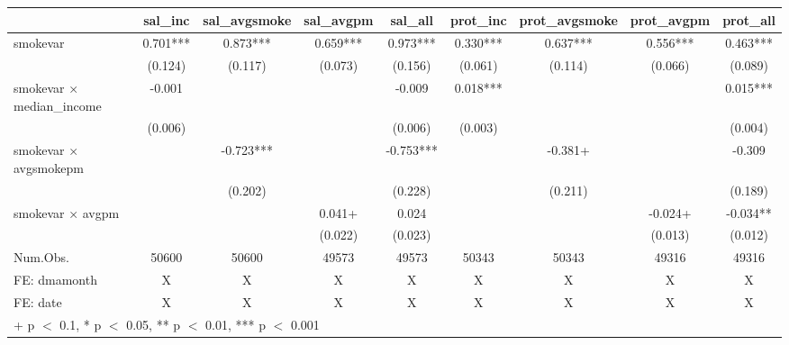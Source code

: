 \begin{table}
\centering
\begin{tabular}[t]{lcccccccc}
\toprule
  & sal\_inc & sal\_avgsmoke & sal\_avgpm & sal\_all & prot\_inc & prot\_avgsmoke & prot\_avgpm & prot\_all\\
\midrule
smokevar & 0.701*** & 0.873*** & 0.659*** & 0.973*** & 0.330*** & 0.637*** & 0.556*** & 0.463***\\
 & (0.124) & (0.117) & (0.073) & (0.156) & (0.061) & (0.114) & (0.066) & (0.089)\\
smokevar × median\_income & -0.001 &  &  & -0.009 & 0.018*** &  &  & 0.015***\\
 & (0.006) &  &  & (0.006) & (0.003) &  &  & (0.004)\\
smokevar × avgsmokepm &  & -0.723*** &  & -0.753*** &  & -0.381+ &  & -0.309\\
 &  & (0.202) &  & (0.228) &  & (0.211) &  & (0.189)\\
smokevar × avgpm &  &  & 0.041+ & 0.024 &  &  & -0.024+ & -0.034**\\
 &  &  & (0.022) & (0.023) &  &  & (0.013) & (0.012)\\
\midrule
Num.Obs. & 50600 & 50600 & 49573 & 49573 & 50343 & 50343 & 49316 & 49316\\
FE: dmamonth & X & X & X & X & X & X & X & X\\
FE: date & X & X & X & X & X & X & X & X\\
\bottomrule
\multicolumn{9}{l}{\rule{0pt}{1em}+ p $<$ 0.1, * p $<$ 0.05, ** p $<$ 0.01, *** p $<$ 0.001}\\
\end{tabular}
\end{table}

